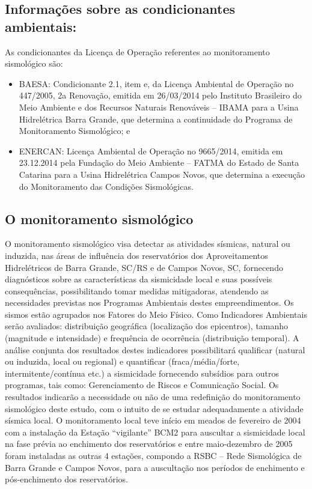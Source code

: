 \subsection{Informações sobre as condicionantes ambientais:}
As condicionantes da Licença de Operação referentes ao monitoramento sismológico são:
\begin{itemize}
    \item BAESA: Condicionante 2.1, item e, da Licença Ambiental de Operação no 447/2005, 2a Renovação, emitida em 26/03/2014 pelo Instituto Brasileiro do Meio Ambiente e dos Recursos Naturais Renováveis – IBAMA para a Usina Hidrelétrica Barra Grande, que determina a continuidade do Programa de Monitoramento Sismológico; e
    \item ENERCAN: Licença Ambiental de Operação no 9665/2014, emitida em 23.12.2014 pela Fundação do Meio Ambiente – FATMA do Estado de Santa Catarina para a Usina Hidrelétrica Campos Novos, que determina a execução do Monitoramento das Condições Sismológicas.
\end{itemize}

\subsection{O monitoramento sismológico}
O monitoramento sismológico visa detectar as atividades sísmicas, natural ou induzida, nas áreas de influência dos reservatórios dos Aproveitamentos Hidrelétricos de Barra Grande, SC/RS e de Campos Novos, SC, fornecendo diagnósticos sobre as características da sismicidade local e suas possíveis consequências, possibilitando tomar medidas mitigadoras, atendendo as necessidades previstas nos Programas Ambientais destes empreendimentos.
Os sismos estão agrupados nos Fatores do Meio Físico. Como Indicadores Ambientais serão avaliados: distribuição geográfica (localização dos epicentros), tamanho (magnitude e intensidade) e frequência de ocorrência (distribuição temporal). A análise conjunta dos resultados destes indicadores possibilitará qualificar (natural ou induzida, local ou regional) e quantificar (fraca/média/forte, intermitente/contínua etc.) a sismicidade fornecendo subsídios para outros programas, tais como: Gerenciamento de Riscos e Comunicação Social. Os resultados indicarão a necessidade ou não de uma redefinição do monitoramento sismológico deste estudo, com o intuito de se estudar adequadamente a atividade sísmica local.
O monitoramento local teve início em meados de fevereiro de 2004 com a instalação da Estação “vigilante” BCM2 para auscultar a sismicidade local na fase  prévia ao enchimento dos reservatórios e entre maio-dezembro de 2005 foram instaladas as outras 4 estações, compondo a RSBC – Rede Sismológica de Barra Grande e Campos Novos, para a auscultação nos períodos de enchimento e pós-enchimento dos reservatórios.

